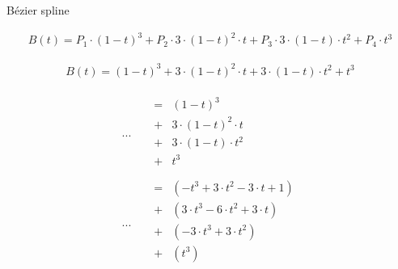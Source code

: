 \documentclass[9pt]{beamer}
\begin{document}
\begin{frame}{B\'{e}zier spline}

		\begin{align*}
		B(t) = P_1 \cdot (1-t)^3 + P_2 \cdot 3 \cdot (1-t)^2 \cdot t + P_3 \cdot 3 \cdot (1-t) \cdot t^2 + P_4 \cdot t^3
		\end{align*}
		
		\begin{align*}
		B(t) = (1-t)^3 + 3 \cdot (1-t)^2 \cdot t + 3 \cdot (1-t) \cdot t^2 + t^3
		\end{align*}
		

	\begin{align*}
		... & \begin{matrix}
		& = & (1-t)^3 \\
		& + & 3 \cdot (1-t)^2 \cdot t \\
		& + & 3 \cdot (1-t) \cdot t^2 \\
		& + & t^3 \\
		\end{matrix} \\ 
		... & 
		\begin{matrix}
		& = & ( -t^3 + 3 \cdot t^2 - 3 \cdot t + 1) \\
		& + & (3 \cdot t^3 - 6 \cdot t^2 + 3 \cdot t) \\
		& + & (-3 \cdot t^3 + 3 \cdot t^2) \\
		& + & (t^3) \\
		\end{matrix}
	\end{align*}
\end{frame}
\end{document}
